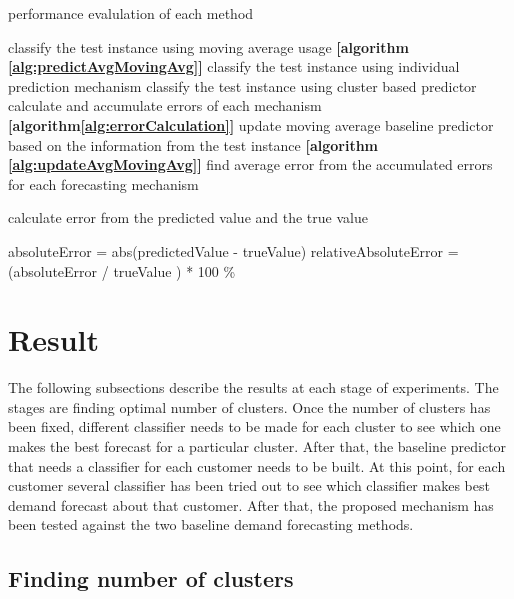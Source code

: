 \begin{algorithm}
\caption{performance evalulation of each method}
\begin{algorithmic} [1]
    \STATE classify the test instance using moving average usage \textbf{[algorithm \ref{alg:predictAvgMovingAvg}]}
    \STATE classify the test instance using individual prediction mechanism
    \STATE classify the test instance using cluster based predictor
    \STATE calculate and accumulate errors of each mechanism \textbf{[algorithm\ref{alg:errorCalculation}]}
    \STATE update moving average baseline predictor based on the information from the test instance \textbf{[algorithm \ref{alg:updateAvgMovingAvg}]}
\ENDFOR 
\STATE find average error from the accumulated errors for each forecasting mechanism
\end{algorithmic}
\label{alg:performanceEval}
\end{algorithm}
\begin{algorithm} [!h]
\caption{calculate error from the predicted value and the true value}
\begin{algorithmic} [1]
\STATE absoluteError = abs(predictedValue - trueValue)
\STATE relativeAbsoluteError = (absoluteError / trueValue ) * 100 \%
\end{algorithmic}
\label{alg:errorCalculation}
\end{algorithm}

\section{Result}
The following subsections describe the results at each stage of experiments. The stages are finding optimal number of clusters. Once the number of clusters has been fixed, different classifier needs to be made for each cluster to see which one makes the best forecast for a particular cluster. After that, the baseline predictor that needs a classifier for each customer needs to be built. At this point, for each customer several classifier has been tried out to see which classifier makes best demand forecast about that customer. After that, the proposed mechanism has been tested against the two baseline demand forecasting methods.

\subsection{Finding number of clusters}

